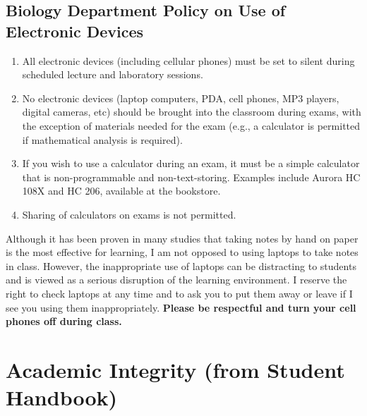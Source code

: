 \documentclass{tufte-handout}
\begin{document}
\begin{fullwidth}



\section{Biology Department Policy on Use of Electronic Devices}

\begin{enumerate}
\item All electronic devices (including cellular phones) must be set to silent during scheduled lecture and laboratory sessions.
\item No electronic devices (laptop computers, PDA, cell phones, MP3 players, digital cameras, etc) should be brought into the classroom during exams, with the exception of materials needed for the exam (e.g., a calculator is permitted if mathematical analysis is required).
\item If you wish to use a calculator during an exam, it must be a simple calculator that is non-programmable and non-text-storing. Examples include Aurora HC 108X and HC 206, available at the bookstore. 
\item Sharing of calculators on exams is not permitted.
\end{enumerate}

Although it has been proven in many studies that taking notes by hand on paper is the most effective for learning, I am not opposed to using laptops to take notes in class. However, the inappropriate use of laptops can be distracting to students and is viewed as a serious disruption of the learning environment. I reserve the right to check laptops at any time and to ask you to put them away or leave if I see you using them inappropriately. \textbf{Please be respectful and turn your cell phones off during class.}

\end{fullwidth}

\section{Academic Integrity (from Student Handbook)}

\end{document}
